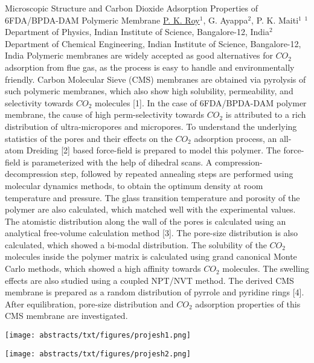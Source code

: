 
    \begin{abstract_online}{Microscopic Structure and Carbon Dioxide Adsorption Properties of 6FDA/BPDA-DAM Polymeric Membrane}{%
        \underline{P. K. Roy}$^{1}$, G. Ayappa$^{2}$, P. K. Maiti$^{1}$}{%
        }{%
        $^1$ Department of Physics, Indian Institute of Science, Bangalore-12, India\newline{}$^2$ Department of Chemical Engineering, Indian Institute of Science, Bangalore-12, India}
    Polymeric membranes are widely accepted as good alternatives for $CO_2$ adsorption from flue gas, as the process is easy to handle and environmentally friendly. Carbon Molecular Sieve (CMS) membranes are obtained via pyrolysis of such polymeric membranes, which also show high solubility, permeability, and selectivity towards $CO_2$ molecules [1]. In the case of 6FDA/BPDA-DAM polymer membrane, the cause of high perm-selectivity towards $CO_2$ is attributed to a rich distribution of ultra-micropores and micropores. To understand the underlying statistics of the pores and their effects on the $CO_2$ adsorption process, an all-atom Dreiding [2] based force-field is prepared to model this polymer. The force-field is parameterized with the help of dihedral scans. A compression-decompression step, followed by repeated annealing steps are performed using molecular dynamics methods, to obtain the optimum density at room temperature and pressure. The glass transition temperature and porosity of the polymer are also calculated, which matched well with the experimental values. The atomistic distribution along the wall of the pores is calculated using an analytical free-volume calculation method [3]. The pore-size distribution is also calculated, which showed a bi-modal distribution. The solubility of the $CO_2$ molecules inside the polymer matrix is calculated using grand canonical Monte Carlo methods, which showed a high affinity towards $CO_2$ molecules. The swelling effects are also studied using a coupled NPT/NVT method. The derived CMS membrane is prepared as a random distribution of pyrrole and pyridine rings [4]. After equilibration, pore-size distribution and $CO_2$ adsorption properties of this CMS membrane are investigated. \begin{center}  \texttt{[image: abstracts/txt/figures/projesh1.png]}  \caption{\textbf{Figure 1:} A slice of the equilibrated polymer matrix (XY plane) showing various pores.}  \end{center}  \begin{center}  \texttt{[image: abstracts/txt/figures/projesh2.png]}  \caption{\textbf{Figure 2:} A slice of the equilibrated polymer matrix (XY plane) upon $CO_2$ (Oxygen – Pink, Carbon – Gray ) adsorption and swelling.}  \end{center}  
    

\end{abstract_online}
